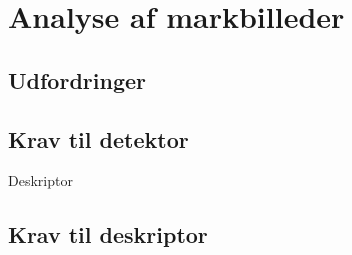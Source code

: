 \chapter{Analyse af markbilleder} \label{sec:mark}
\section{Udfordringer}
\section{Krav til detektor}
Deskriptor
\section{Krav til deskriptor}